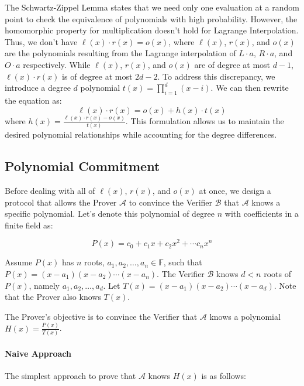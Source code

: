 \documentclass{article}
\begin{document}
The Schwartz-Zippel Lemma states that we need only one evaluation at a random point to check the equivalence of polynomials with high probability.
However, the homomorphic property for multiplication doesn't hold for Lagrange Interpolation. Thus, we don't have $\ell(x) \cdot r(x) = o(x)$, where $\ell(x)$, $r(x)$, and $o(x)$ are the polynomials resulting from the Lagrange interpolation of $L \cdot a$, $R \cdot a$, and $O \cdot a$ respectively. While $\ell(x)$, $r(x)$, and $o(x)$ are of degree at most $d-1$, $\ell(x) \cdot r(x)$ is of degree at most $2d-2$.
To address this discrepancy, we introduce a degree $d$ polynomial $t(x) = \prod_{i=1}^{d} (x - i)$. We can then rewrite the equation as:
\begin{equation}
\ell(x) \cdot r(x) = o(x) + h(x) \cdot t(x)
\end{equation}
where $h(x) = \frac{\ell(x) \cdot r(x) - o(x)}{t(x)}$. This formulation allows us to maintain the desired polynomial relationships while accounting for the degree differences.

\subsection{Polynomial Commitment}

Before dealing with all of $\ell(x)$, $r(x)$, and $o(x)$ at once, we design a protocol that allows the Prover $\mathcal{A}$ to convince the Verifier $\mathcal{B}$ that $\mathcal{A}$ knows a specific polynomial. Let's denote this polynomial of degree $n$ with coefficients in a finite field as:

\begin{equation}
    P(x) = c_0 + c_1 x + c_2 x^{2} + \cdots c_n x^{n}
\end{equation}

Assume $P(x)$ has $n$ roots, $a_1, a_2, \ldots, a_n \in \mathbb{F}$, such that $P(x) = (x - a_1)(x - a_2)\cdots(x - a_n)$. The Verifier $\mathcal{B}$ knows $d < n$ roots of $P(x)$, namely $a_1, a_2, \ldots, a_d$. Let $T(x) = (x - a_1)(x - a_2)\cdots(x - a_d)$. Note that the Prover also knows $T(x)$.

The Prover's objective is to convince the Verifier that $\mathcal{A}$ knows a polynomial $H(x) = \frac{P(x)}{T(x)}$.

\paragraph{Naive Approach}

The simplest approach to prove that $\mathcal{A}$ knows $H(x)$ is as follows:
\end{document}
